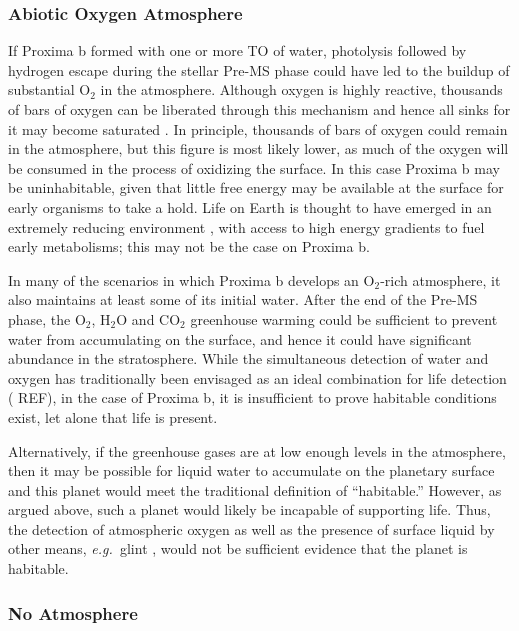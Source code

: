 \documentclass[preprint,12pt]{aastex}
\newcommand{\xxx}[1]{{\color{red} #1}} %
\def\eg{{\it e.g.\ }}
\begin{document}
\subsubsection{Abiotic Oxygen Atmosphere}
\label{sec:results:atmstates:o2atmos}

If Proxima b formed with one or more TO of water, photolysis followed
by hydrogen escape during the stellar Pre-MS phase could have led to the 
buildup of substantial O$_2$ in the atmosphere. Although oxygen
is highly reactive, thousands of bars of oxygen can be liberated
through this mechanism \citep{LugerBarnes15} and hence all sinks for
it may become saturated \citep{Schaefer16}. In principle, thousands of
bars of oxygen could remain in the atmosphere, but this figure is most likely lower,
as much of the oxygen will be consumed in the process of oxidizing the surface. 
In this case Proxima b may be uninhabitable, given that little free energy
may be available at the surface for early organisms to take a hold. Life on
Earth is thought to have emerged in an extremely reducing environment
\citep{Oparin24, Haldane29}, with access to high energy gradients to fuel
early metabolisms; this may not be the case on Proxima b.

In many of the scenarios in which Proxima b develops an O$_2$-rich atmosphere,
it also maintains at least some of its initial water.
After the end of the Pre-MS phase, the O$_2$, H$_2$O and CO$_2$
greenhouse warming could be sufficient to prevent water from
accumulating on the surface, and hence it could have significant
abundance in the stratosphere. While the simultaneous detection of
water and oxygen has traditionally been envisaged as an ideal
combination for life detection (\xxx{REF}), in the case of Proxima b, it is
insufficient to prove habitable conditions exist, let alone that life
is present.

Alternatively, if the greenhouse gases are at low enough levels in the atmosphere,
then it may be possible for liquid water to accumulate on the
planetary surface and this planet would meet the traditional
definition of ``habitable.'' However, as argued above, such a planet
would likely be incapable of supporting life.
Thus, the detection of atmospheric oxygen as well as the
presence of surface liquid by other means, \eg glint
\citep{Robinson10}, would not be sufficient evidence that the planet
is habitable.

\subsubsection{No Atmosphere}
\label{sec:results:atmstates:noatmos}
\end{document}
